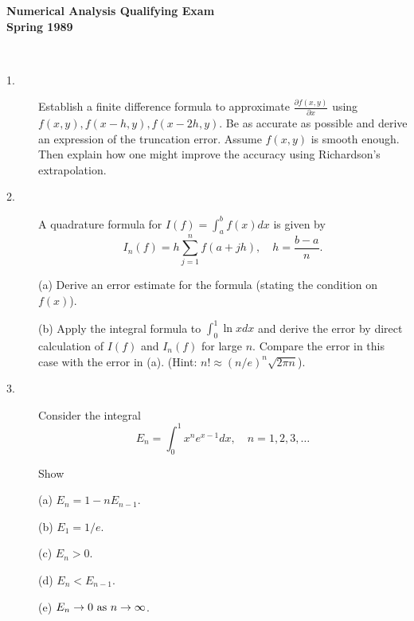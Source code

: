 \documentclass{article}
\begin{document}






\begin{center}\begin{LARGE}
{\bf Numerical Analysis Qualifying Exam}\\ 
{\bf Spring 1989}\\ \end{LARGE}
\end{center}
\vspace{0.1in}
\noindent\hrulefill\\

\begin{description}
\item[1.]
Establish a finite difference formula to approximate
$\frac{\partial f(x,y)}{\partial x}$ using $f(x,y), f(x-h,y), f(x-2h,y)$.
Be as accurate as possible and derive an expression of the truncation
error. Assume $f(x,y)$ is smooth enough. Then explain how one might
improve the accuracy using Richardson's extrapolation.

\item[2.]
A quadrature formula for $I(f) = \int^b_a f(x) dx$ is given by
$$ I_n(f) = h \sum^n_{j=1} f(a+ jh), \quad h = \frac{b-a}{n}.$$

\item[\quad] (a)
Derive an error estimate for the formula (stating the condition on $f (x)$).

\item[\quad] (b)
Apply the integral formula to $\int^1_0 \ln xdx$ and derive the error by
direct calculation of $I(f)$ and $I_n(f)$ for large $n$. Compare the
error in this case with the error in (a).
(Hint: $n! \approx (n/e)^n \sqrt{2\pi n}$).

\item[3.]
Consider the integral
$$E_n = \int^1_0 x^ne^{x-1} dx, \quad n = 1,2,3, \dots $$

Show

\item[\quad] (a)
$E_n = 1-nE_{n-1}.$

\item[\quad] (b)
$E_1 = 1/e$.

\item[\quad] (c)
$E_n > 0$.

\item[\quad] (d)
$E_n < E_{n-1}$.

\item[\quad] (e)
$E_n \to 0 \hbox{\ as\ } n \to \infty$.


\end{description}
\end{document}
